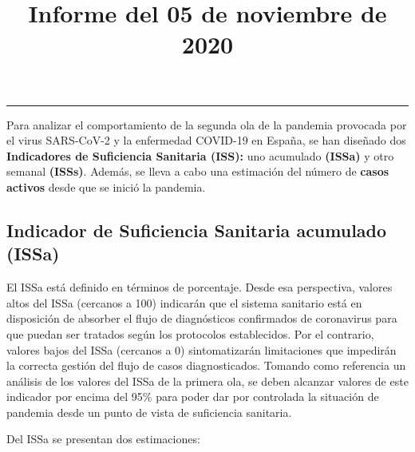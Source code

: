 \documentclass[
  11pt,
]{article}
\title{Informe del 05 de noviembre de 2020}
\author{}
\date{\vspace{-2.5em}}
\begin{document}
\maketitle

\renewcommand{\figurename}{Figura}
\renewcommand{\tablename}{Tabla}

\tableofcontents

\vspace{.5cm}

\begin{center}\rule{0.5\linewidth}{0.5pt}\end{center}

\vspace{.5cm}

Para analizar el comportamiento de la segunda ola de la pandemia
provocada por el virus SARS-CoV-2 y la enfermedad COVID-19 en España, se
han diseñado dos \textbf{Indicadores de Suficiencia Sanitaria (ISS):}
uno acumulado \textbf{(ISSa)} y otro semanal \textbf{(ISSs)}. Además, se
lleva a cabo una estimación del número de \textbf{casos activos} desde
que se inició la pandemia.

\hypertarget{indicador-de-suficiencia-sanitaria-acumulado-issa}{%
\subsection{Indicador de Suficiencia Sanitaria acumulado
(ISSa)}\label{indicador-de-suficiencia-sanitaria-acumulado-issa}}

El ISSa está definido en términos de porcentaje. Desde esa perspectiva,
valores altos del ISSa (cercanos a 100) indicarán que el sistema
sanitario está en disposición de absorber el flujo de diagnósticos
confirmados de coronavirus para que puedan ser tratados según los
protocolos establecidos. Por el contrario, valores bajos del ISSa
(cercanos a 0) sintomatizarán limitaciones que impedirán la correcta
gestión del flujo de casos diagnosticados. Tomando como referencia un
análisis de los valores del ISSa de la primera ola, se deben alcanzar
valores de este indicador por encima del 95\% para poder dar por
controlada la situación de pandemia desde un punto de vista de
suficiencia sanitaria.

Del ISSa se presentan dos estimaciones:
\end{document}
